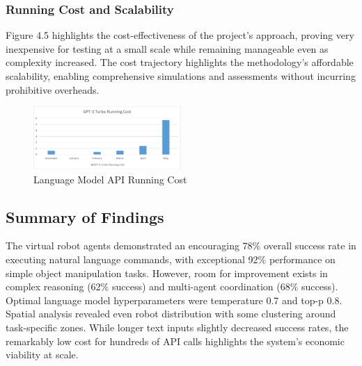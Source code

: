 \documentclass[pdflatex,sn-mathphys-num]{sn-jnl}%
\theoremstyle{thmstyleone}%
\theoremstyle{thmstyletwo}%
\theoremstyle{thmstylethree}%
\begin{document}
\subsubsection{Running Cost and Scalability}
Figure 4.5 highlights the cost-effectiveness of the project's approach, proving very inexpensive for testing at a small scale while remaining manageable even as complexity increased. The cost trajectory highlights the methodology's affordable scalability, enabling comprehensive simulations and assessments without incurring prohibitive overheads.

\begin{figure}[H]
\centering
\includegraphics[width=0.5\textwidth]{figures/running_cost.png}
\caption{Language Model API Running Cost}\label{fig11}
\end{figure}


\subsection{Summary of Findings}
The virtual robot agents demonstrated an encouraging 78\% overall success rate in executing natural language commands, with exceptional 92\% performance on simple object manipulation tasks. However, room for improvement exists in complex reasoning (62\% success) and multi-agent coordination (68\% success). Optimal language model hyperparameters were temperature 0.7 and top-p 0.8. Spatial analysis revealed even robot distribution with some clustering around task-specific zones. While longer text inputs slightly decreased success rates, the remarkably low cost for hundreds of API calls highlights the system's economic viability at scale.


\end{document}
